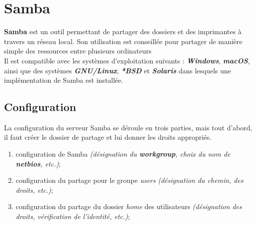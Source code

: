 \section{Samba}
\label{sec:samba}

\textbf{Samba} est un outil permettant de partager des dossiers et des
imprimantes à travers un réseau local. Son utilisation est conseillée pour
partager de manière simple des ressources entre plusieurs ordinateurs  \\
Il est compatible avec les systèmes d'exploitation suivants :
\textit{\textbf{Windows}}, \textit{\textbf{macOS}}, ainsi que des systèmes \textit{\textbf{GNU/Linux}},
\textit{\textbf{*BSD}} et \textit{\textbf{Solaris}} dans lesquels une implémentation de Samba est
installée.


\subsection{Configuration}
\label{subsec:configuration}

La configuration du serveur Samba se déroule en trois parties, mais tout d'abord,
il faut créer le dossier de partage et lui donner les droits appropriés. \\

\begin{enumerate}

    \item configuration de Samba \textit{(désignation du \textbf{workgroup},
    choix du nom de \textbf{netbios}, etc.)};
    \item configuration du partage pour le groupe \og \textit{users} \fg
    \textit{(désignation du chemin, des droits, etc.)};
    \item configuration du partage du dossier \og \textit{home} \fg des utilisateurs
    \textit{(désignation des droits, vérification de l'identité, etc.)};

\end{enumerate}

